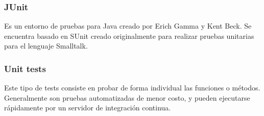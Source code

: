 \documentclass[conference]{IEEEtran}
\begin{document}
\subsubsection{JUnit}

Es un entorno de pruebas para Java creado por Erich Gamma y Kent Beck. Se encuentra basado en SUnit creado originalmente para realizar pruebas unitarias para el lenguaje Smalltalk.

\subsubsection{Unit tests}

Este tipo de tests consiste en probar de forma individual las funciones o métodos. Generalmente son pruebas automatizadas de menor costo, y pueden ejecutarse rápidamente por un servidor de integración continua.



\normalsize
\end{document}
